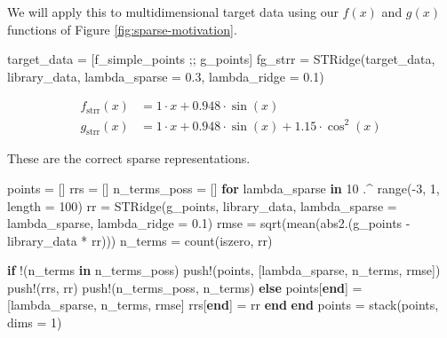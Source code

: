 \documentclass[
]{article}
\newenvironment{Shaded}{\begin{snugshade}}{\end{snugshade}}
\newcommand{\ControlFlowTok}[1]{\textcolor[rgb]{0.00,0.23,0.31}{\textbf{#1}}}
\newcommand{\FloatTok}[1]{\textcolor[rgb]{0.68,0.00,0.00}{#1}}
\newcommand{\FunctionTok}[1]{\textcolor[rgb]{0.28,0.35,0.67}{#1}}
\newcommand{\KeywordTok}[1]{\textcolor[rgb]{0.00,0.23,0.31}{\textbf{#1}}}
\newcommand{\NormalTok}[1]{\textcolor[rgb]{0.00,0.23,0.31}{#1}}
\newcommand{\OperatorTok}[1]{\textcolor[rgb]{0.37,0.37,0.37}{#1}}
\begin{document}
We will apply this to multidimensional target data using our \(f(x)\)
and \(g(x)\) functions of Figure \ref{fig:sparse-motivation}.

\begin{Shaded}
\begin{Highlighting}[]
\NormalTok{target\_data }\OperatorTok{=}\NormalTok{ [f\_simple\_points ;; g\_points]}
\NormalTok{fg\_strr }\OperatorTok{=} \FunctionTok{STRidge}\NormalTok{(target\_data, library\_data, lambda\_sparse }\OperatorTok{=} \FloatTok{0.3}\NormalTok{, lambda\_ridge }\OperatorTok{=} \FloatTok{0.1}\NormalTok{)}
\end{Highlighting}
\end{Shaded}

\begin{subequations} \label{eq:g-strr} \begin{align}    f_{\text{strr}}(x) &= 1 \cdot x + 0.948 \cdot \sin\left( x \right) \\
  g_{\text{strr}}(x) &= 1 \cdot x + 0.948 \cdot \sin\left( x \right) + 1.15 \cdot \cos^{2}\left( x \right) \end{align} \end{subequations}

These are the correct sparse representations.

\begin{Shaded}
\begin{Highlighting}[]
\NormalTok{points }\OperatorTok{=}\NormalTok{ []}
\NormalTok{rrs }\OperatorTok{=}\NormalTok{ []}
\NormalTok{n\_terms\_poss }\OperatorTok{=}\NormalTok{ []}
\ControlFlowTok{for}\NormalTok{ lambda\_sparse }\KeywordTok{in} \FloatTok{10} \OperatorTok{.\^{}} \FunctionTok{range}\NormalTok{(}\OperatorTok{{-}}\FloatTok{3}\NormalTok{, }\FloatTok{1}\NormalTok{, length }\OperatorTok{=} \FloatTok{100}\NormalTok{)}
\NormalTok{  rr }\OperatorTok{=} \FunctionTok{STRidge}\NormalTok{(g\_points, library\_data, lambda\_sparse }\OperatorTok{=}\NormalTok{ lambda\_sparse, lambda\_ridge }\OperatorTok{=} \FloatTok{0.1}\NormalTok{)}
\NormalTok{  rmse }\OperatorTok{=} \FunctionTok{sqrt}\NormalTok{(}\FunctionTok{mean}\NormalTok{(}\FunctionTok{abs2}\NormalTok{.(g\_points }\OperatorTok{{-}}\NormalTok{ library\_data }\OperatorTok{*}\NormalTok{ rr)))}
\NormalTok{  n\_terms }\OperatorTok{=} \FunctionTok{count}\NormalTok{(iszero, rr)}

  \ControlFlowTok{if}\NormalTok{ !(n\_terms }\KeywordTok{in}\NormalTok{ n\_terms\_poss)}
    \FunctionTok{push!}\NormalTok{(points, [lambda\_sparse, n\_terms, rmse])}
    \FunctionTok{push!}\NormalTok{(rrs, rr)}
    \FunctionTok{push!}\NormalTok{(n\_terms\_poss, n\_terms)}
  \ControlFlowTok{else}
\NormalTok{    points[}\KeywordTok{end}\NormalTok{] }\OperatorTok{=}\NormalTok{ [lambda\_sparse, n\_terms, rmse]}
\NormalTok{    rrs[}\KeywordTok{end}\NormalTok{] }\OperatorTok{=}\NormalTok{ rr}
  \ControlFlowTok{end}
\ControlFlowTok{end}
\NormalTok{points }\OperatorTok{=} \FunctionTok{stack}\NormalTok{(points, dims }\OperatorTok{=} \FloatTok{1}\NormalTok{)}
\end{Highlighting}
\end{Shaded}
\end{document}
